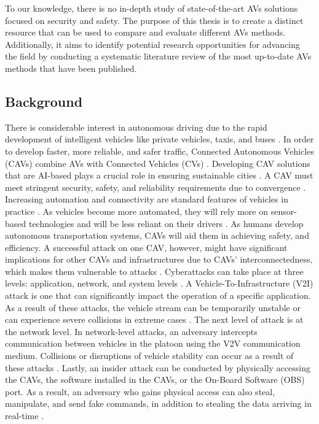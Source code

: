 \documentclass[a4paper,12pt]{article}
\begin{document}
To our knowledge, there is no in-depth study of state-of-the-art AVs solutions focused on security and safety. The purpose of this thesis is to create a distinct resource that can be used to compare and evaluate different AVs methods. Additionally, it aims to identify potential research opportunities for advancing the field by conducting a systematic literature review of the most up-to-date AVs methods that have been published.






\subsection{Background}


\hspace{5mm} There is considerable interest in autonomous driving due to the rapid development of intelligent vehicles like private vehicles, taxis, and buses \cite{article1}. In order to develop faster, more reliable, and safer traffic, Connected Autonomous Vehicles (CAVs) combine AVs with Connected Vehicles (CVs) \cite{article5}. Developing CAV solutions that are AI-based plays a crucial role in ensuring sustainable cities \cite{article5}. A CAV must meet stringent security, safety, and reliability requirements due to convergence \cite{article5}. Increasing automation and connectivity are standard features of vehicles in practice \cite{article5}. As vehicles become more automated, they will rely more on sensor-based technologies and will be less reliant on their drivers \cite{article5}. As humans develop autonomous transportation systems, CAVs will aid them in achieving safety, and efficiency. A successful attack on one CAV, however, might have significant implications for other CAVs and infrastructures due to CAVs' interconnectedness, which makes them vulnerable to attacks \cite{article12}.\newline 
\hspace{5mm} Cyberattacks can take place at three levels: application, network, and system levels \cite{article13}. A Vehicle-To-Infrastructure (V2I) attack is one that can significantly impact the operation of a specific application. As a result of these attacks, the vehicle stream can be temporarily unstable or can experience severe collisions in extreme cases \cite{article13}. The next level of attack is at the network level. In network-level attacks, an adversary intercepts communication between vehicles in the platoon using the V2V communication medium. Collisions or disruptions of vehicle stability can occur as a result of these attacks \cite{article13}. Lastly, an insider attack can be conducted by physically accessing the CAVs, the software installed in the CAVs, or the On-Board Software (OBS) port. As a result, an adversary who gains physical access can also steal, manipulate, and send fake commands, in addition to stealing the data arriving in real-time \cite{article13}. \par
\end{document}
